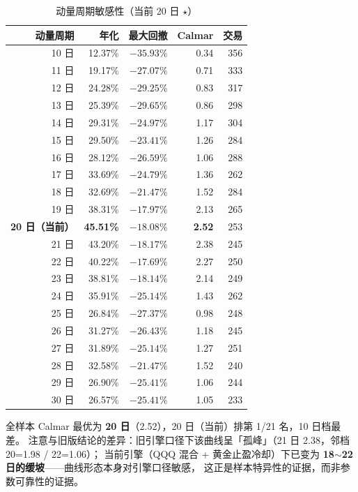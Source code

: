 \documentclass[11pt]{ctexart}
\begin{document}
\begin{table}[htbp]
\centering
\caption{动量周期敏感性（当前 20 日 $\star$）}
\small
\begin{tabular}{rrrrr}
\toprule
动量周期 & 年化 & 最大回撤 & Calmar & 交易 \\
\midrule
10 日 & 12.37\% & $-35.93\%$ & 0.34 & 356 \\
11 日 & 19.17\% & $-27.07\%$ & 0.71 & 333 \\
12 日 & 24.28\% & $-29.25\%$ & 0.83 & 317 \\
13 日 & 25.39\% & $-29.65\%$ & 0.86 & 298 \\
14 日 & 29.31\% & $-24.97\%$ & 1.17 & 304 \\
15 日 & 29.50\% & $-23.41\%$ & 1.26 & 284 \\
16 日 & 28.12\% & $-26.59\%$ & 1.06 & 288 \\
17 日 & 33.69\% & $-24.79\%$ & 1.36 & 262 \\
18 日 & 32.69\% & $-21.47\%$ & 1.52 & 284 \\
19 日 & 38.31\% & $-17.97\%$ & 2.13 & 265 \\
\textbf{20 日（当前）} & \textbf{45.51\%} & \textbf{$-18.08\%$} & \textbf{2.52} & 253 \\
21 日 & 43.20\% & $-18.17\%$ & 2.38 & 245 \\
22 日 & 40.22\% & $-17.69\%$ & 2.27 & 250 \\
23 日 & 38.81\% & $-18.14\%$ & 2.14 & 249 \\
24 日 & 35.91\% & $-25.14\%$ & 1.43 & 262 \\
25 日 & 26.84\% & $-27.37\%$ & 0.98 & 248 \\
26 日 & 31.27\% & $-26.43\%$ & 1.18 & 245 \\
27 日 & 31.89\% & $-25.14\%$ & 1.27 & 251 \\
28 日 & 32.58\% & $-21.47\%$ & 1.52 & 240 \\
29 日 & 26.90\% & $-25.41\%$ & 1.06 & 244 \\
30 日 & 26.57\% & $-25.41\%$ & 1.05 & 233 \\
\bottomrule
\end{tabular}
\end{table}

全样本 Calmar 最优为 \textbf{20 日}（2.52），20 日（当前）排第 1/21 名，10 日档最差。
注意与旧版结论的差异：旧引擎口径下该曲线呈「孤峰」（21 日 2.38，邻档 20=1.98 / 22=1.06）；
当前引擎（QQQ 混合 + 黄金止盈冷却）下已变为 \textbf{18$\sim$22 日的缓坡}——曲线形态本身对引擎口径敏感，
这正是样本特异性的证据，而非参数可靠性的证据。
\end{document}
